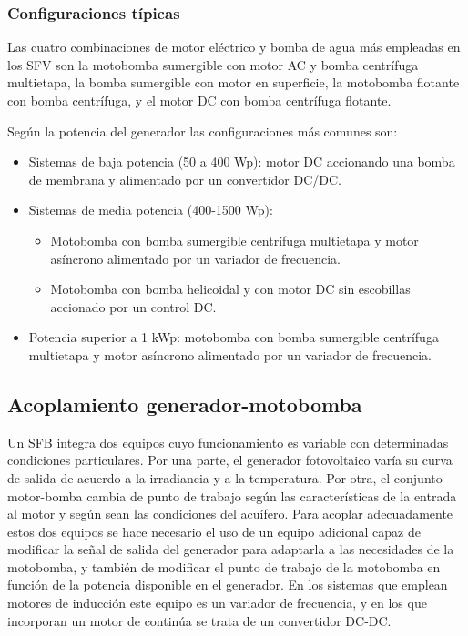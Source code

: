 \subsubsection{Configuraciones típicas}

Las cuatro combinaciones de motor eléctrico y bomba de agua más empleadas
en los SFV son la motobomba sumergible con motor AC y bomba centrífuga
multietapa, la bomba sumergible con motor en superficie, la motobomba
flotante con bomba centrífuga, y el motor DC con bomba centrífuga
flotante.

Según la potencia del generador las configuraciones más comunes son:
\begin{itemize}
\item Sistemas de baja potencia (50 a 400 Wp): motor DC accionando una bomba
de membrana y alimentado por un convertidor DC/DC.
\item Sistemas de media potencia (400-1500 Wp):

\begin{itemize}
\item Motobomba con bomba sumergible centrífuga multietapa y motor asíncrono
alimentado por un variador de frecuencia.
\item Motobomba con bomba helicoidal y con motor DC sin escobillas accionado
por un control DC.
\end{itemize}
\item Potencia superior a 1 kWp: motobomba con bomba sumergible centrífuga
multietapa y motor asíncrono alimentado por un variador de frecuencia.
\end{itemize}

\subsection{Acoplamiento generador-motobomba}

Un SFB integra dos equipos cuyo funcionamiento es variable con determinadas
condiciones particulares. Por una parte, el generador fotovoltaico
varía su curva de salida de acuerdo a la irradiancia y a la temperatura.
Por otra, el conjunto motor-bomba cambia de punto de trabajo según
las características de la entrada al motor y según sean las condiciones
del acuífero. Para acoplar adecuadamente estos dos equipos se hace
necesario el uso de un equipo adicional capaz de modificar la señal
de salida del generador para adaptarla a las necesidades de la motobomba,
y también de modificar el punto de trabajo de la motobomba en función
de la potencia disponible en el generador. En los sistemas que emplean
motores de inducción este equipo es un variador de frecuencia, y en
los que incorporan un motor de continúa se trata de un convertidor
DC-DC.


